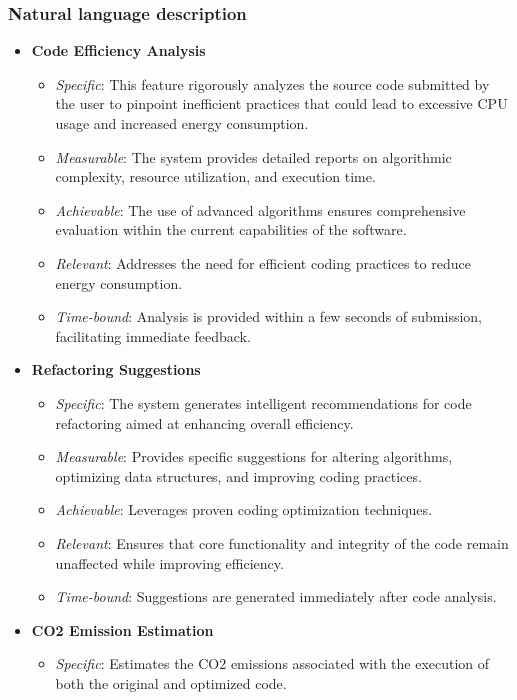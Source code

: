 \documentclass[conference,compsoc]{IEEEtran}
\begin{document}
\subsubsection{Natural language description}
\begin{itemize}
	\item \textbf{Code Efficiency Analysis}
	      \begin{itemize}
		      \item \textit{Specific}: This feature rigorously analyzes the source code submitted by the user to pinpoint inefficient practices that could lead to excessive CPU usage and increased energy consumption.
		      \item \textit{Measurable}: The system provides detailed reports on algorithmic complexity, resource utilization, and execution time.
		      \item \textit{Achievable}: The use of advanced algorithms ensures comprehensive evaluation within the current capabilities of the software.
		      \item \textit{Relevant}: Addresses the need for efficient coding practices to reduce energy consumption.
		      \item \textit{Time-bound}: Analysis is provided within a few seconds of submission, facilitating immediate feedback.
	      \end{itemize}
	\item \textbf{Refactoring Suggestions}
	      \begin{itemize}
		      \item \textit{Specific}: The system generates intelligent recommendations for code refactoring aimed at enhancing overall efficiency.
		      \item \textit{Measurable}: Provides specific suggestions for altering algorithms, optimizing data structures, and improving coding practices.
		      \item \textit{Achievable}: Leverages proven coding optimization techniques.
		      \item \textit{Relevant}: Ensures that core functionality and integrity of the code remain unaffected while improving efficiency.
		      \item \textit{Time-bound}: Suggestions are generated immediately after code analysis.
	      \end{itemize}
	\item \textbf{CO2 Emission Estimation}
	      \begin{itemize}
		      \item \textit{Specific}: Estimates the CO2 emissions associated with the execution of both the original and optimized code.

\end{itemize}
\end{itemize}
\end{document}
